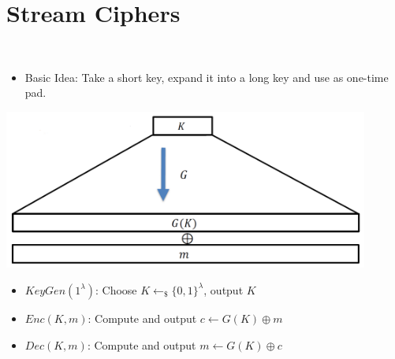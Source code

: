 

\chapter{Stream Ciphers}	
	
	\begin{definition}\ 
	    \begin{itemize}
	        \item Basic Idea: Take a short key, expand it into a long key and use as one-time pad.
	    \end{itemize}
		\begin{center}
			\includegraphics[width=120mm]{Graphics/Basics of Private Key Encryption/StreamCiphers.png}\newline
		\end{center}
		\begin{itemize}
	        \item $KeyGen(1^{\lambda})$: Choose $K \leftarrow_{\$} \{0,1\}^{\lambda}$, output $K$
	        \item $Enc(K,m)$: Compute and output $c \leftarrow G(K) \oplus m$
	        \item $Dec(K,m)$: Compute and output $m \leftarrow G(K) \oplus c$
		\end{itemize}
	\end{definition}
	

